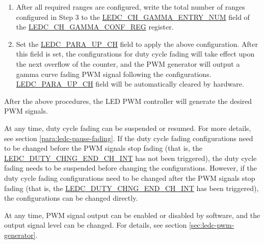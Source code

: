 \documentclass[main\_\_EN.tex]{subfiles}
\begin{document}
\begin{enumerate}
\begin{enumerate}
\begin{enumerate}
\begin{itemize}
                \item Once the above procedures are finished, the configuration for one range is complete. Other ranges are configured by repeating the same set of procedures. You can configure any number of ranges from 0 to 15, and each can be configured independently.
            \end{itemize}
            \item After all required ranges are configured, write the total number of ranges configured in Step 3 to the \hyperref[fielddesc:LEDCCHNGAMMAENTRYNUM]{LEDC\_CH\_GAMMA\_ENTRY\_NUM} field of the \hyperref[regdesc:LEDCCHNGAMMACONFREG]{LEDC\_CH\_GAMMA\_CONF\_REG} register.
            \item Set the \hyperref[fielddesc:LEDCPARAUPCHN]{LEDC\_PARA\_UP\_CH} field to apply the above configuration. After this field is set, the configurations for duty cycle fading will take effect upon the next overflow of the counter, and the PWM generator will output a gamma curve fading PWM signal following the configurations. \hyperref[fielddesc:LEDCPARAUPCHN]{LEDC\_PARA\_UP\_CH} field will be automatically cleared by hardware.
        \end{enumerate}
    \end{enumerate}
\end{enumerate}

After the above procedures, the LED PWM controller will generate the desired PWM signals.

At any time, duty cycle fading can be suspended or resumed. For more details, see section \ref{para:ledc-pause-fading}. If the duty cycle fading configurations need to be changed before the PWM signals stop fading (that is, the \hyperref[int:ledc-duty-chng-end]{LEDC\_DUTY\_CHNG\_END\_CH\_INT} has not been triggered), the duty cycle fading needs to be suspended before changing the configurations. However, if the duty cycle fading configurations need to be changed after the PWM signals stop fading (that is, the \hyperref[int:ledc-duty-chng-end]{LEDC\_DUTY\_CHNG\_END\_CH\_INT} has been triggered), the configurations can be changed directly.

At any time, PWM signal output can be enabled or disabled by software, and the output signal level can be changed. For details, see section \ref{sec:ledc-pwm-generator}.


\end{document}
